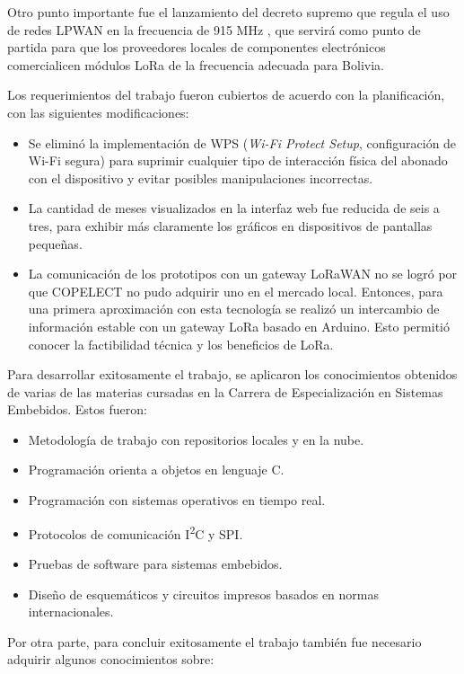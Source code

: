Otro punto importante fue el lanzamiento del decreto supremo que regula el uso de redes LPWAN en la frecuencia de 915 MHz \citep{WEBSITE:27}, que servirá como punto de partida para que los proveedores locales de componentes electrónicos comercialicen módulos LoRa de la frecuencia adecuada para Bolivia.

Los requerimientos del trabajo fueron cubiertos de acuerdo con la planificación, con las siguientes modificaciones:
\begin{itemize}
	\item Se eliminó la implementación de WPS (\textit{Wi-Fi Protect Setup}, configuración de Wi-Fi segura) para suprimir cualquier tipo de interacción física del abonado con el dispositivo y evitar posibles manipulaciones incorrectas.
	\item La cantidad de meses visualizados en la interfaz web fue reducida de seis a tres, para exhibir más claramente los gráficos en dispositivos de pantallas pequeñas.
		\item La comunicación de los prototipos con un gateway LoRaWAN no se logró por que COPELECT no pudo adquirir uno en el mercado local. Entonces, para una primera aproximación con esta tecnología se realizó un intercambio de información estable con un gateway LoRa basado en Arduino. Esto permitió conocer la factibilidad técnica y los beneficios de LoRa.
\end{itemize}

Para desarrollar exitosamente el trabajo, se aplicaron los conocimientos obtenidos de varias de las materias cursadas en la Carrera de Especialización en Sistemas Embebidos. Estos fueron:

\begin{itemize}
	\item Metodología de trabajo con repositorios locales y en la nube.
	\item Programación orienta a objetos en lenguaje C.
	\item Programación con sistemas operativos en tiempo real.
	\item Protocolos de comunicación I\textsuperscript{2}C y SPI.
	\item Pruebas de software para sistemas embebidos.
	\item Diseño de esquemáticos y circuitos impresos basados en normas internacionales.
\end{itemize}

Por otra parte, para concluir exitosamente el trabajo también fue necesario adquirir algunos conocimientos sobre:

